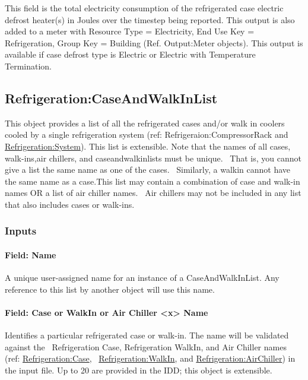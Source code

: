 This field is the total electricity consumption of the refrigerated case electric defrost heater(s) in Joules over the timestep being reported. This output is also added to a meter with Resource Type = Electricity, End Use Key = Refrigeration, Group Key = Building (Ref. Output:Meter objects). This output is available if case defrost type is Electric or Electric with Temperature Termination.

\subsection{Refrigeration:CaseAndWalkInList}\label{refrigerationcaseandwalkinlist}

This object provides a list of all the refrigerated cases and/or walk in coolers cooled by a single refrigeration system (ref: Refrigeraion:CompressorRack and \hyperref[refrigerationsystem]{Refrigeration:System}). This list is extensible. Note that the names of all cases, walk-ins,air chillers, and caseandwalkinlists must be unique.~ That is, you cannot give a list the same name as one of the cases.~ Similarly, a walkin cannot have the same name as a case.This list may contain a combination of case and walk-in names OR a list of air chiller names.~ Air chillers may not be included in any list that also includes cases or walk-ins.

\subsubsection{Inputs}\label{inputs-2-033}

\paragraph{Field: Name}\label{field-name-2-032}

A unique user-assigned name for an instance of a CaseAndWalkInList. Any reference to this list by another object will use this name.

\paragraph{Field: Case or WalkIn or Air Chiller \textless{}x\textgreater{} Name}\label{field-case-or-walkin-or-air-chiller-x-name}

Identifies a particular refrigerated case or walk-in. The name will be validated against the~ Refrigeration Case, Refrigeration WalkIn, and Air Chiller names (ref: \hyperref[refrigerationcase]{Refrigeration:Case},~ \hyperref[refrigerationwalkin]{Refrigeration:WalkIn}, and \hyperref[refrigerationairchiller]{Refrigeration:AirChiller}) in the input file. Up to 20 are provided in the IDD; this object is extensible.

